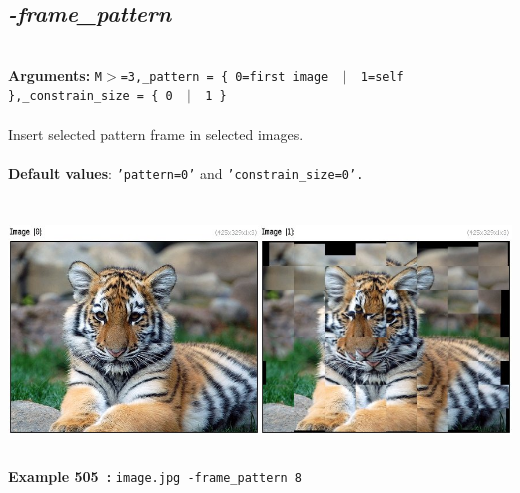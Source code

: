 \documentclass[a4paper,11pt,twoside]{book}
\begin{document}
\subsection{\emph{-frame\_pattern} }\vspace*{-0.5em}
~\\\textbf{Arguments: } 
{\small \texttt{M$>$=3,\_pattern = \{ 0=first image ~$|$~ 1=self \},\_constrain\_size = \{ 0 ~$|$~ 1 \}}}\\~\\
Insert selected pattern frame in selected images.
~\\~\\\textbf{Default values}: {\small \texttt{'pattern=0'} and \texttt{'constrain\_size=0'.}}
\begin{center}\includegraphics[keepaspectratio=true,height=7cm,width=\textwidth]{img/gmic_def505.jpg}\\
{\footnotesize \textbf{Example 505~:} \texttt{image.jpg -frame\_pattern 8}}
\end{center}
\end{document}
